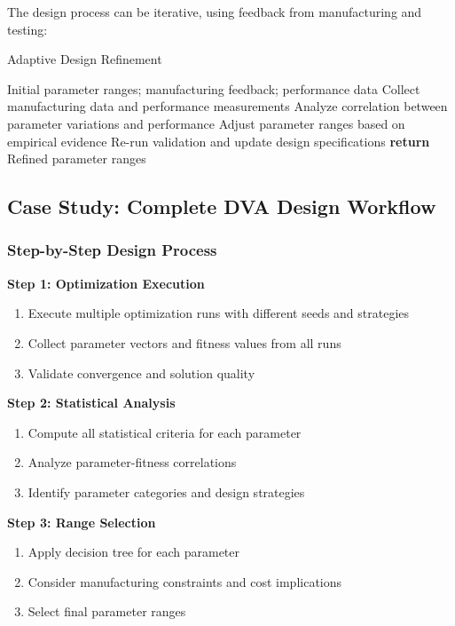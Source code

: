 \documentclass[12pt,a4paper]{article}
\begin{document}
The design process can be iterative, using feedback from manufacturing and testing:

\begin{algorithm}[H]
\caption{Adaptive Design Refinement}
\begin{algorithmic}[1]
\REQUIRE Initial parameter ranges; manufacturing feedback; performance data
\STATE Collect manufacturing data and performance measurements
\STATE Analyze correlation between parameter variations and performance
\STATE Adjust parameter ranges based on empirical evidence
\STATE Re-run validation and update design specifications
\STATE \textbf{return} Refined parameter ranges
\end{algorithmic}
\end{algorithm}

\subsection{Case Study: Complete DVA Design Workflow}

\subsubsection{Step-by-Step Design Process}

\textbf{Step 1: Optimization Execution}
\begin{enumerate}
    \item Execute multiple optimization runs with different seeds and strategies
    \item Collect parameter vectors and fitness values from all runs
    \item Validate convergence and solution quality
\end{enumerate}

\textbf{Step 2: Statistical Analysis}
\begin{enumerate}
    \item Compute all statistical criteria for each parameter
    \item Analyze parameter-fitness correlations
    \item Identify parameter categories and design strategies
\end{enumerate}

\textbf{Step 3: Range Selection}
\begin{enumerate}
    \item Apply decision tree for each parameter
    \item Consider manufacturing constraints and cost implications
    \item Select final parameter ranges
\end{enumerate}
\end{document}
